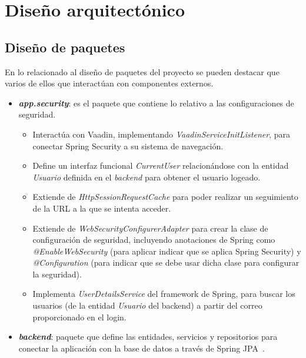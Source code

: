 \begin{landscape}
\end{landscape}

\section{Diseño arquitectónico}
\subsection{Diseño de paquetes}
En lo relacionado al diseño de paquetes del proyecto se pueden destacar que varios de ellos que interactúan con componentes externos.

\begin{itemize}
    \item \textit{\textbf{app.security}}: es el paquete que contiene lo relativo a las configuraciones de seguridad. 
    
    \begin{itemize}
        \item Interactúa con Vaadin, implementando \textit{VaadinServiceInitListener}, para conectar Spring Security a su sistema de navegación.
        
        \item Define un interfaz funcional \textit{CurrentUser} relacionándose con la entidad \textit{Usuario} definida en el \textit{backend} para obtener el usuario logeado.
        
        \item Extiende de \textit{HttpSessionRequestCache} para poder realizar un seguimiento de la URL a la que se intenta acceder.
        
        \item Extiende de \textit{WebSecurityConfigurerAdapter} para crear la clase de configuración de seguridad, incluyendo anotaciones de Spring como \textit{@EnableWebSecurity} (para aplicar indicar que se aplica Spring Security) y \textit{@Configuration} (para indicar que se debe usar dicha clase para configurar la seguridad).
        
        \item Implementa \textit{UserDetailsService} del framework de Spring, para buscar los usuarios (de la entidad \textit{Usuario} del backend) a partir del correo proporcionado en el login. 
    \end{itemize}
    
    \item \textit{\textbf{backend}}: paquete que define las entidades, servicios y repositorios para conectar la aplicación con la base de datos a través de Spring JPA~\cite{pagina_spring_jpa}.
    

\end{itemize}

